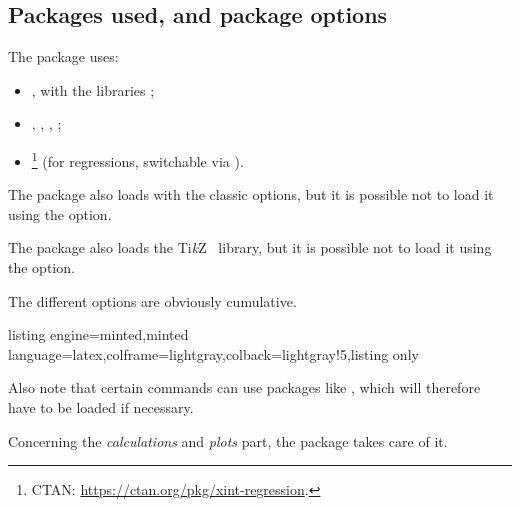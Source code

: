 \documentclass[11pt,a4paper]{ltxdoc}
\providecommand\tikzlogo{Ti\textit{k}Z}
\let\TikZ\tikzlogo
\begin{document}
\subsection{Packages used, and package options}

The package uses:

\smallskip

\begin{itemize}
	\item {}, with the libraries ;
	\item {}, , , ;
	\item {}\footnote{CTAN: \url{https://ctan.org/pkg/xint-regression}.} (for regressions, switchable via \MontreCode{[noxintreg]}).
\end{itemize}

\smallskip

The package also loads  with the classic options, but it is possible not to load it using the \MontreCode{[nosiunitx]} option.

\smallskip

The package also loads the \TikZ\  library, but it is possible not to load it using the \MontreCode{[notikzbabel]} option.

\smallskip

The different options are obviously cumulative.

\begin{tcblisting}{listing engine=minted,minted language=latex,colframe=lightgray,colback=lightgray!5,listing only}
\usepackage{tkz-grapheur}
\usepackage[english]{tkz-grapheur}

\usepackage[nosiunitx]{tkz-grapheur}

\usepackage[notikzbabel]{tkz-grapheur}
\end{tcblisting}

Also note that certain commands can use packages like , which will therefore have to be loaded if necessary.

\smallskip

Concerning the \textit{calculations} and \textit{plots} part, the  package takes care of it.
\end{document}
